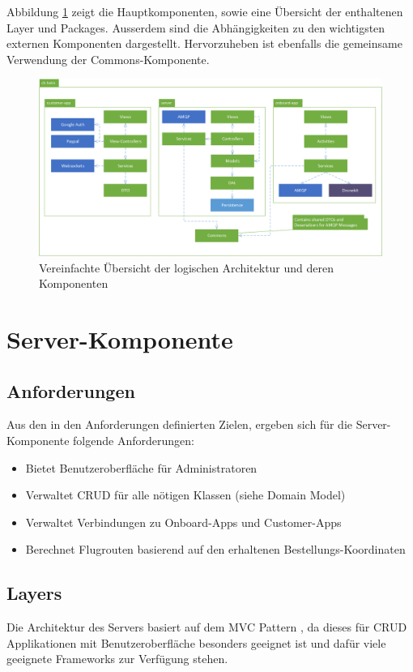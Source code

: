 Abbildung \ref{fig:logical-architecture-overview} zeigt die Hauptkomponenten, sowie eine Übersicht der enthaltenen Layer und Packages. Ausserdem sind die Abhängigkeiten zu den wichtigsten externen Komponenten dargestellt. Hervorzuheben ist ebenfalls die gemeinsame Verwendung der Commons-Komponente. 

\begin{figure}[h]
	\includegraphics[width=1.0\textwidth]{images/logical-architecture-overview.png}
	\caption{Vereinfachte Übersicht der logischen Architektur und deren Komponenten }
	\label{fig:logical-architecture-overview}
\end{figure}

\section{Server-Komponente}

\subsection{Anforderungen}
Aus den in den Anforderungen definierten Zielen, ergeben sich für die Server-Komponente folgende Anforderungen:

\begin{itemize}
	\item Bietet Benutzeroberfläche für Administratoren
	\item Verwaltet CRUD für alle nötigen Klassen (siehe Domain Model)
	\item Verwaltet Verbindungen zu Onboard-Apps und Customer-Apps
	\item Berechnet Flugrouten basierend auf den erhaltenen Bestellungs-Koordinaten
\end{itemize}

\subsection{Layers}
Die Architektur des Servers basiert auf dem {MVC Pattern \cite{MVC}}, da dieses für CRUD Applikationen mit Benutzeroberfläche besonders geeignet ist und dafür viele geeignete Frameworks zur Verfügung stehen.\\

